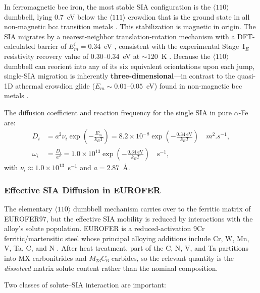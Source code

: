 \documentclass[pdflatex,sn-basic]{sn-jnl} %
\begin{document}
In ferromagnetic bcc iron, the most stable SIA configuration is the $\langle110\rangle$ dumbbell, lying 0.7~eV below the $\langle111\rangle$ crowdion that is the ground state in all non-magnetic bcc transition metals \citep{Fu2004, Domain2001, NguyenManh2006}. This stabilization is magnetic in origin. The SIA migrates by a nearest-neighbor translation-rotation mechanism with a DFT-calculated barrier of $E_m^i = 0.34$~eV \citep{Fu2004, Chiesa2009}, consistent with the experimental Stage~I$_E$ resistivity recovery value of 0.30--0.34~eV at $\sim$120~K \citep{Ullmaier1991}. Because the $\langle110\rangle$ dumbbell can reorient into any of its six equivalent orientations upon each jump, single-SIA migration is inherently \textbf{three-dimensional}---in contrast to the quasi-1D athermal crowdion glide ($E_m \sim 0.01$--$0.05$~eV) found in non-magnetic bcc metals \citep{Derlet2007, Fitzgerald2008}.

The diffusion coefficient and reaction frequency for the single SIA in pure $\alpha$-Fe are:
\begin{align}
    D_i &= a^2 \nu_i \exp\!\left(-\frac{E_m^i}{k_B T}\right)
         = 8.2 \times 10^{-8} \exp\!\left(-\frac{0.34~\text{eV}}{k_B T}\right) \quad \si{m^2.s^{-1}}, \label{eq:Di_explicit} \\[4pt]
    \omega_i &= \frac{D_i}{a^2}
              = 1.0\times 10^{13} \exp\!\left(-\frac{0.34~\text{eV}}{k_B T}\right) \quad \text{s}^{-1}, \label{eq:omega_i_explicit}
\end{align}
with $\nu_i \approx 1.0 \times 10^{13}$~s$^{-1}$ and $a = 2.87$~\AA.

\subsubsection{Effective SIA Diffusion in EUROFER}

The elementary $\langle110\rangle$ dumbbell mechanism carries over to the ferritic matrix of EUROFER97, but the effective SIA mobility is reduced by interactions with the alloy's solute population. EUROFER is a reduced-activation 9Cr ferritic/martensitic steel whose principal alloying additions include Cr, W, Mn, V, Ta, C, and N \citep{vanderschaaf2003, Aktaa2020}. After heat treatment, part of the C, N, V, and Ta partitions into MX carbonitrides and $M_{23}C_6$ carbides, so the relevant quantity is the \emph{dissolved} matrix solute content rather than the nominal composition.

Two classes of solute--SIA interaction are important:
\end{document}
